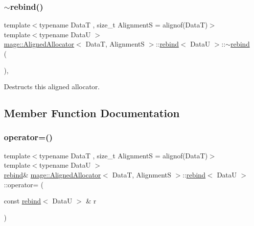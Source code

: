 \subsubsection{\texorpdfstring{$\sim$rebind()}{~rebind()}}
{\footnotesize\ttfamily template$<$typename DataT , size\+\_\+t AlignmentS = alignof(\+Data\+T)$>$ \\
template$<$typename DataU $>$ \\
\hyperlink{classmage_1_1_aligned_allocator}{mage\+::\+Aligned\+Allocator}$<$ DataT, AlignmentS $>$\+::\hyperlink{structmage_1_1_aligned_allocator_1_1rebind}{rebind}$<$ DataU $>$\+::$\sim$\hyperlink{structmage_1_1_aligned_allocator_1_1rebind}{rebind} (\begin{DoxyParamCaption}{ }\end{DoxyParamCaption})\hspace{0.3cm}{\ttfamily [private]}, {\ttfamily [delete]}}

Destructs this aligned allocator. 

\subsection{Member Function Documentation}
\hypertarget{structmage_1_1_aligned_allocator_1_1rebind_a32b474cf072c192715654d74b639c9f7}{}\label{structmage_1_1_aligned_allocator_1_1rebind_a32b474cf072c192715654d74b639c9f7} 
\subsubsection{\texorpdfstring{operator=()}{operator=()}\hspace{0.1cm}{\footnotesize\ttfamily [1/2]}}
{\footnotesize\ttfamily template$<$typename DataT , size\+\_\+t AlignmentS = alignof(\+Data\+T)$>$ \\
template$<$typename DataU $>$ \\
\hyperlink{structmage_1_1_aligned_allocator_1_1rebind}{rebind}\& \hyperlink{classmage_1_1_aligned_allocator}{mage\+::\+Aligned\+Allocator}$<$ DataT, AlignmentS $>$\+::\hyperlink{structmage_1_1_aligned_allocator_1_1rebind}{rebind}$<$ DataU $>$\+::operator= (\begin{DoxyParamCaption}\item[{const \hyperlink{structmage_1_1_aligned_allocator_1_1rebind}{rebind}$<$ DataU $>$ \&}]{r }\end{DoxyParamCaption})\hspace{0.3cm}{\ttfamily [delete]}}

